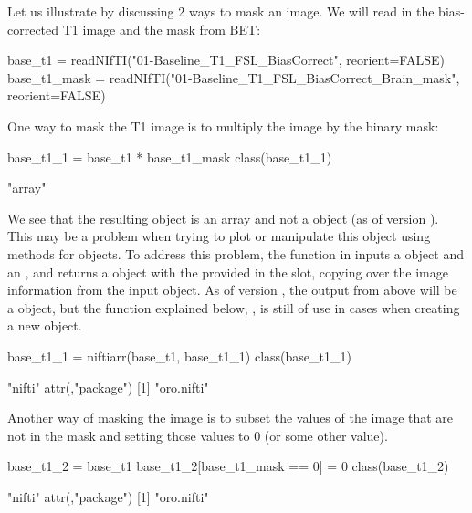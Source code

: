 Let us illustrate by discussing 2 ways to mask an image.   We will read in the bias-corrected T1 image and the mask from BET:



\begin{Schunk}
\begin{Sinput}
base_t1 = readNIfTI("01-Baseline_T1_FSL_BiasCorrect", reorient=FALSE)
base_t1_mask = readNIfTI("01-Baseline_T1_FSL_BiasCorrect_Brain_mask", reorient=FALSE)
\end{Sinput}
\end{Schunk}


One way to mask the T1 image is to multiply the image by the binary mask:
\begin{Schunk}
\begin{Sinput}
base_t1_1 = base_t1 * base_t1_mask
class(base_t1_1)
\end{Sinput}
\begin{Soutput}
[1] "array"
\end{Soutput}
\end{Schunk}

We see that the resulting object is an array and not a  object (as of  version ).  This may be a problem when trying to plot or manipulate this object using methods for  objects.  To address this problem, the  function in  inputs a  object and an , and returns a  object with the provided  in the  slot, copying over the image information from the input  object.   As of  version , the output from above will be a  object, but the function explained below, , is still of use in cases when creating a new  object.

\begin{Schunk}
\begin{Sinput}
base_t1_1 = niftiarr(base_t1, base_t1_1)
class(base_t1_1)
\end{Sinput}
\begin{Soutput}
[1] "nifti"
attr(,"package")
[1] "oro.nifti"
\end{Soutput}
\end{Schunk}

Another way of masking the image is to subset the values of the image that are not in the mask and setting those values to $0$ (or some other value).
\begin{Schunk}
\begin{Sinput}
base_t1_2 = base_t1
base_t1_2[base_t1_mask == 0] = 0
class(base_t1_2)
\end{Sinput}
\begin{Soutput}
[1] "nifti"
attr(,"package")
[1] "oro.nifti"
\end{Soutput}
\end{Schunk}

